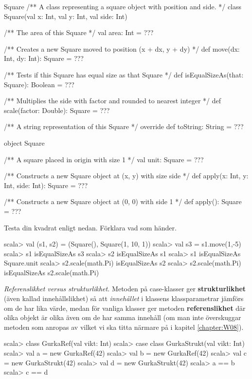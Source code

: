 \begin{ScalaSpec}{Square}
/** A class representing a square object with position and side. */
class Square(val x: Int, val y: Int, val side: Int) {
  /** The area of this Square */
  val area: Int = ???
  
  /** Creates a new Square moved to position (x + dx, y + dy) */
  def move(dx: Int, dy: Int): Square = ???
  
  /** Tests if this Square has equal size as that Square */
  def isEqualSizeAs(that: Square): Boolean = ???
  
  /** Multiplies the side with factor and rounded to nearest integer */
  def scale(factor: Double): Square = ???
  
  /** A string representation of this Square */
  override def toString: String = ???
}

object Square {
  /** A square placed in origin with size 1 */
  val unit: Square = ??? 
  
  /** Constructs a new Square object at (x, y) with size side */
  def apply(x: Int, y: Int, side: Int): Square = ???

  /** Constructs a new Square object at (0, 0) with side 1 */
  def apply(): Square = ???
}
\end{ScalaSpec}

\Subtask Testa din kvadrat enligt nedan. Förklara vad som händer.

\begin{REPL}
scala> val (s1, s2) = (Square(), Square(1, 10, 1))
scala> val s3 = s1.move(1,-5)
scala> s1 isEqualSizeAs s3
scala> s2 isEqualSizeAs s1
scala> s1 isEqualSizeAs Square.unit
scala> s2.scale(math.Pi) isEqualSizeAs s2
scala> s2.scale(math.Pi) isEqualSizeAs s2.scale(math.Pi)
\end{REPL}

\Task \emph{Referenslikhet versus strukturlikhet.} Metoden \code{==} på case-klasser ger \textbf{strukturlikhet} (även kallad innehållslikhet) så att \emph{innehållet} i klassens klassparametrar jämförs om de har lika värde, medan för vanliga klasser ger metoden \code{==} \textbf{referenslikhet} där olika objekt är olika även om de har samma innehåll (om man inte överskuggar metoden  som anropas av \code{==} vilket vi ska titta närmare på i kapitel \ref{chapter:W08}).

\begin{REPL}
scala> class GurkaRef(val vikt: Int)
scala> case class GurkaStrukt(val vikt: Int)
scala> val a = new GurkaRef(42)
scala> val b = new GurkaRef(42)
scala> val c = new GurkaStrukt(42)
scala> val d = new GurkaStrukt(42)
scala> a == b
scala> c == d 
\end{REPL}

